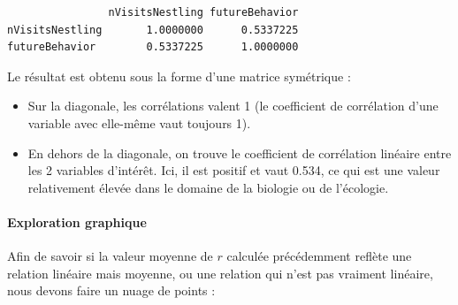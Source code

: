 \documentclass[a4paperpaper,]{article}
\newenvironment{Shaded}{\begin{snugshade}}{\end{snugshade}}
\newcommand{\DataTypeTok}[1]{\textcolor[rgb]{0.00,0.34,0.68}{#1}}
\newcommand{\KeywordTok}[1]{\textcolor[rgb]{0.12,0.11,0.11}{\textbf{#1}}}
\newcommand{\NormalTok}[1]{\textcolor[rgb]{0.12,0.11,0.11}{#1}}
\newcommand{\OperatorTok}[1]{\textcolor[rgb]{0.12,0.11,0.11}{#1}}
\newcommand{\StringTok}[1]{\textcolor[rgb]{0.75,0.01,0.01}{#1}}
\providecommand{\tightlist}{%
  \setlength{\itemsep}{0pt}\setlength{\parskip}{0pt}}
\let\oldparagraph\paragraph
\renewcommand{\paragraph}[1]{\oldparagraph{#1}\mbox{}}
\begin{document}
\begin{Shaded}
\end{Shaded}

\begin{verbatim}
                nVisitsNestling futureBehavior
nVisitsNestling       1.0000000      0.5337225
futureBehavior        0.5337225      1.0000000
\end{verbatim}

Le résultat est obtenu sous la forme d'une matrice symétrique :

\begin{itemize}
\tightlist
\item
  Sur la diagonale, les corrélations valent 1 (le coefficient de corrélation d'une variable avec elle-même vaut toujours 1).
\item
  En dehors de la diagonale, on trouve le coefficient de corrélation linéaire entre les 2 variables d'intérêt. Ici, il est positif et vaut 0.534, ce qui est une valeur relativement élevée dans le domaine de la biologie ou de l'écologie.
\end{itemize}

\hypertarget{exploration-graphique-4}{%
\paragraph{Exploration graphique}\label{exploration-graphique-4}}

Afin de savoir si la valeur moyenne de \(r\) calculée précédemment reflète une relation linéaire mais moyenne, ou une relation qui n'est pas vraiment linéaire, nous devons faire un nuage de points :

\begin{Shaded}
\end{Shaded}
\end{document}
